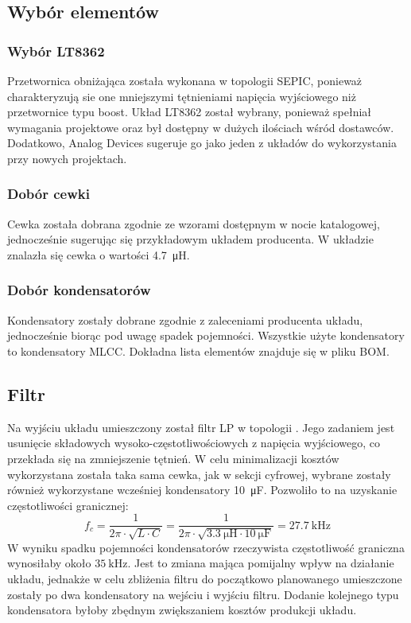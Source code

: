 \documentclass[11pt]{article}
\begin{document}
\subsection{Wybór elementów}
\subsubsection{Wybór LT8362}
Przetwornica obniżająca została wykonana w topologii SEPIC, ponieważ charakteryzują sie one mniejszymi tętnieniami napięcia wyjściowego niż przetwornice typu boost. Układ LT8362 został wybrany, ponieważ spełniał wymagania projektowe oraz był dostępny w dużych ilościach wśród dostawców. Dodatkowo, Analog Devices sugeruje go jako jeden z układów do wykorzystania przy nowych projektach.

\subsubsection{Dobór cewki}
Cewka została dobrana zgodnie ze wzorami dostępnym w nocie katalogowej, jednocześnie sugerując się przykładowym układem producenta. W układzie znalazła się cewka o wartości \SI{4.7}{\micro\henry}.

\subsubsection{Dobór kondensatorów}
Kondensatory zostały dobrane zgodnie z zaleceniami producenta układu, jednocześnie biorąc pod uwagę spadek pojemności. Wszystkie użyte kondensatory to kondensatory MLCC. Dokładna lista elementów znajduje się w pliku BOM.

\subsection{Filtr}
Na wyjściu układu umieszczony został filtr LP w topologii \Pi. Jego zadaniem jest usunięcie składowych wysoko-częstotliwościowych z napięcia wyjściowego, co przekłada się na zmniejszenie tętnień. W celu minimalizacji kosztów wykorzystana została taka sama cewka, jak w sekcji cyfrowej, wybrane zostały również wykorzystane wcześniej kondensatory \SI{10}{\micro\farad}. Pozwoliło to na uzyskanie częstotliwości granicznej: $$f_c = \frac{1}{2\pi \cdot \sqrt{L \cdot C}} = \frac{1}{2\pi \cdot \sqrt{\SI{3.3}{\micro\henry} \cdot \SI{10}{\micro\farad}}} = \SI{27.7}{\kilo\hertz}$$
W wyniku spadku pojemności kondensatorów rzeczywista częstotliwość graniczna wynosiłaby około $\SI{35}{\kilo\hertz}$. Jest to zmiana mająca pomijalny wpływ na działanie układu, jednakże w celu zbliżenia filtru do początkowo planowanego umieszczone zostały po dwa kondensatory na wejściu i wyjściu filtru. Dodanie kolejnego typu kondensatora byłoby zbędnym zwiększaniem kosztów produkcji układu.
\end{document}
